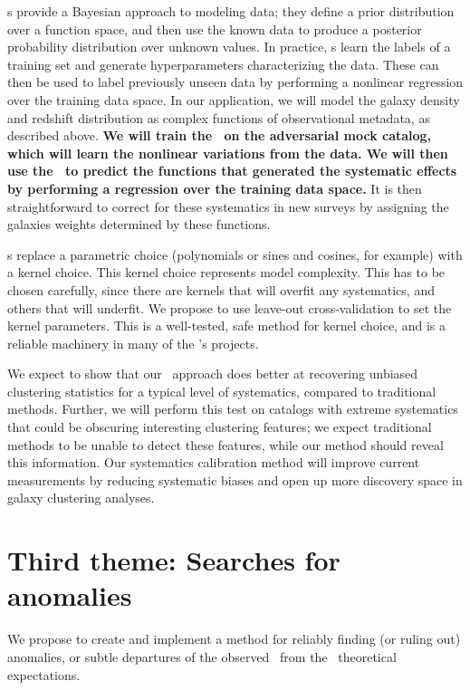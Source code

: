 \documentclass[12pt, fullpage, letterpaper]{article}
\begin{document}
\GP s provide a Bayesian approach to modeling data; they define a prior distribution over a function space, and then use the known data to produce a posterior probability distribution over unknown values. 
In practice, \GP s learn the labels of a training set and generate hyperparameters characterizing the data.
These can then be used to label previously unseen data by performing a nonlinear regression over the training data space.
In our application, we will model the galaxy density and redshift distribution as complex functions of observational metadata, as described above.
\textbf{We will train the \GP\ on the adversarial mock catalog, which will learn the nonlinear variations from the data.
We will then use the \GP\ to predict the functions that generated the systematic effects by performing a regression over the training data space.}
It is then straightforward to correct for these systematics in new surveys by assigning the galaxies weights determined by these functions.

\GP s replace a parametric choice (polynomials or sines and cosines, for example) with a kernel choice.
This kernel choice represents model complexity.
This has to be chosen carefully, since there are kernels that will overfit any systematics, and others that will underfit.
We propose to use leave-out cross-validation to set the kernel parameters.
This is a well-tested, safe method for kernel choice, and is a reliable machinery in many of the \PI's projects.

We expect to show that our \GP\ approach does better at recovering unbiased clustering statistics for a typical level of systematics, compared to traditional methods.
Further, we will perform this test on catalogs with extreme systematics that could be obscuring interesting clustering features; we expect traditional methods to be unable to detect these features, while our method should reveal this information.
Our systematics calibration method will improve current measurements by reducing systematic biases and open up more discovery space in galaxy clustering analyses.

\section{Third theme: Searches for anomalies}

We propose to create and implement a method for reliably finding (or ruling out) anomalies,
or subtle departures of the observed \LSS\ from the \LCDM\ theoretical expectations.
\end{document}

